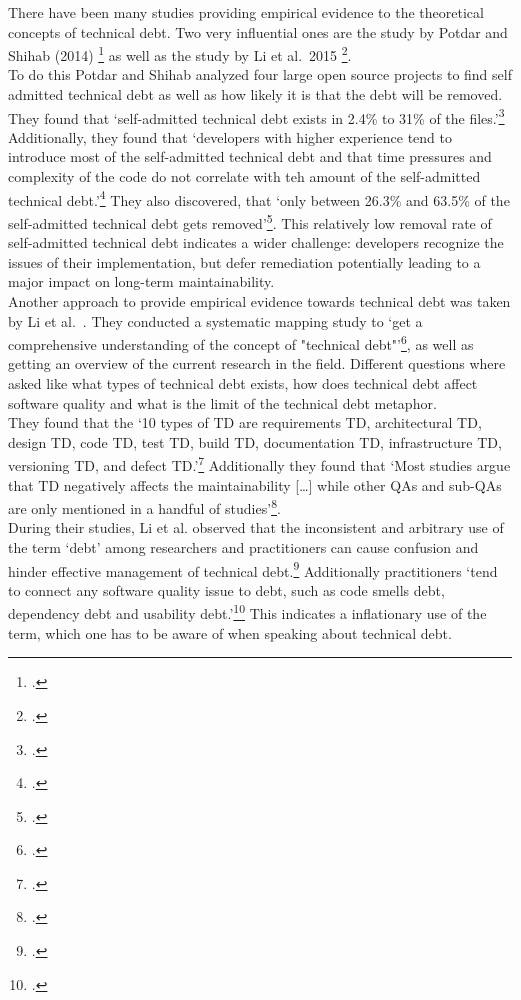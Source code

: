 There have been many studies providing empirical evidence to the theoretical concepts of technical debt. Two very influential ones are the study by Potdar and Shihab (2014) \footcite{potdarExploratoryStudySelfAdmitted2014} as well as the study by Li et al.\ 2015 \footcite{liSystematicMappingStudy2015}.\\
To do this Potdar and Shihab analyzed four large open source projects to find self admitted technical debt as well as how likely it is that the debt will be removed. They found that `self-admitted technical debt exists in 2.4\% to 31\% of the files.'\footcite[1]{potdarExploratoryStudySelfAdmitted2014}
Additionally, they found that `developers with higher experience tend to introduce most of the self-admitted technical debt and that time pressures and complexity of the code do not correlate with teh amount of the self-admitted technical debt.'\footcite[1]{potdarExploratoryStudySelfAdmitted2014}
They also discovered, that `only between 26.3\% and 63.5\% of the self-admitted technical debt gets removed'\footcite[1]{potdarExploratoryStudySelfAdmitted2014}. This relatively low removal rate of self-admitted technical debt indicates a wider challenge:
developers recognize the issues of their implementation, but defer remediation potentially leading to a major impact on long-term maintainability.\\
Another approach to provide empirical evidence towards technical debt was taken by Li et al.\ . They conducted a systematic mapping study to `get a comprehensive understanding of the concept of "technical debt"'\footcite[194]{liSystematicMappingStudy2015}, as well as getting an overview of the current research in the field.
Different questions where asked like what types of technical debt exists, how does technical debt affect software quality and what is the limit of the technical debt metaphor.\\
They found that the `10 types of TD are requirements TD, architectural TD, design TD, code TD, test TD, build TD, documentation TD, infrastructure TD, versioning TD, and defect TD.'\footcite[215]{liSystematicMappingStudy2015}
Additionally they found that `Most studies argue that TD negatively affects the maintainability [\ldots] while other QAs and sub-QAs are only mentioned in a handful of studies'\footcite[215]{liSystematicMappingStudy2015}.\\
During their studies,  Li et al. observed that the inconsistent and arbitrary use of the term `debt' among researchers and practitioners can cause confusion and hinder effective management of technical debt.\footcite[211]{liSystematicMappingStudy2015} Additionally practitioners `tend to connect any software quality issue to debt, such as code smells debt, dependency debt and usability debt.'\footcite[212]{liSystematicMappingStudy2015}
This indicates a inflationary use of the term, which one has to be aware of when speaking about technical debt.\\


